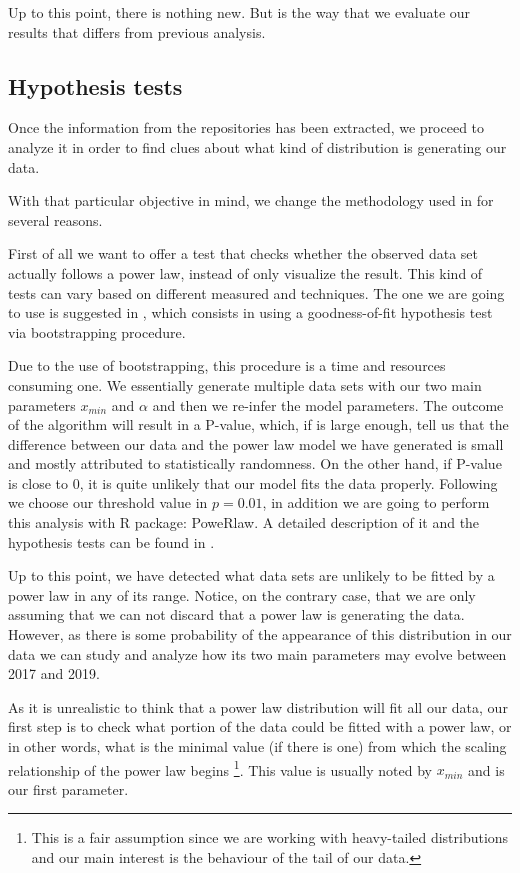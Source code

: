 \documentclass{article}
\begin{document}
Up to this point, there is nothing new. But is the way that we
evaluate our results that differs from previous analysis.

\subsection{Hypothesis tests}

Once the information from the repositories has been extracted, we
proceed to analyze it in order to find clues about what kind of
distribution is generating our data.

With that particular objective in mind, we change the methodology used
in \cite{merelo2017self} for several reasons.

First of all we want to offer a test that checks whether the observed
data set actually follows a power law, instead of only visualize the
result.  This kind of tests can vary based on different measured and
techniques. The one we are going to use is suggested in
\cite{clauset2009power}, which consists in using a goodness-of-fit
hypothesis test via bootstrapping procedure.

Due to the use of bootstrapping, this procedure is a time and
resources consuming one.  We essentially generate multiple data sets
with our two main parameters $x_{min}$ and $\alpha$ and then we
re-infer the model parameters. The outcome of the algorithm will
result in a P-value, which, if is large enough, tell us that the
difference between our data and the power law model we have generated
is small and mostly attributed to statistically randomness. On the
other hand, if P-value is close to 0, it is quite unlikely that our
model fits the data properly.  Following \cite{clauset2009power} we
choose our threshold value in $p=0.01$, in addition we are going to
perform this analysis with R package: PoweRlaw. A detailed description
of it and the hypothesis tests can be found in
\cite{gillespie2015power}.

Up to this point, we have detected what data sets are unlikely to be
fitted by a power law in any of its range. Notice, on the contrary
case, that we are only assuming that we can not discard that a power
law is generating the data.  However, as there is some probability of
the appearance of this distribution in our data we can study and
analyze how its two main parameters may evolve between 2017 and 2019.

As it is unrealistic to think that a power law distribution will fit
all our data, our first step is to check what portion of the data
could be fitted with a power law, or in other words, what is the
minimal value (if there is one) from which the scaling relationship of
the power law begins \footnote{This is a fair assumption since we are
  working with heavy-tailed distributions and our main interest is the
  behaviour of the tail of our data.}.  This value is usually noted by
$x_{min}$ and is our first parameter.
\end{document}
